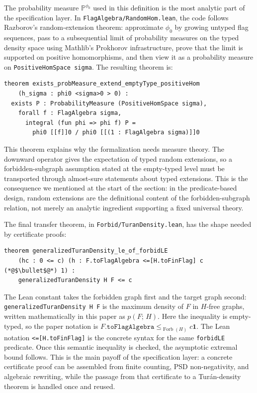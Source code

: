 \documentclass{article}
\newcommand{\tdensity}[2]{p(#1;\,#2)}
\newcommand{\forbLE}[1]{\leq_{\operatorname{Forb}(#1)}}
\newcommand{\lean}[1]{\texttt{#1}}
\begin{document}
The probability measure $\mathbb{P}^{\phi_0}$ used in this definition is
the most analytic part of the specification layer.  In
\lean{FlagAlgebra/RandomHom.lean}, the code follows Razborov's random-extension
theorem: approximate $\phi_0$ by growing untyped flag sequences, pass to a
subsequential limit of probability measures on the typed density space using
Mathlib's Prokhorov infrastructure, prove that the limit is supported on
positive homomorphisms, and then view it as a probability measure on
\lean{PositiveHomSpace sigma}.  The resulting theorem is:
\begin{lstlisting}
theorem exists_probMeasure_extend_emptyType_positiveHom
    (h_sigma : phi0 <sigma>0 > 0) :
  exists P : ProbabilityMeasure (PositiveHomSpace sigma),
    forall f : FlagAlgebra sigma,
      integral (fun phi => phi f) P =
        phi0 [[f]]0 / phi0 [[(1 : FlagAlgebra sigma)]]0
\end{lstlisting}
This theorem explains why the formalization needs measure theory.  The
downward operator gives the expectation of typed random extensions, so a
forbidden-subgraph assumption stated at the empty-typed level must be
transported through almost-sure statements about typed extensions.  This is
the consequence we mentioned at the start of the section: in the
predicate-based design, random extensions are the definitional content of the
forbidden-subgraph relation, not merely an analytic ingredient supporting a
fixed universal theory.

The final transfer theorem, in \lean{Forbid/TuranDensity.lean}, has the shape
needed by certificate proofs:
\begin{lstlisting}
theorem generalizedTuranDensity_le_of_forbidLE
    (hc : 0 <= c) (h : F.toFlagAlgebra <=[H.toFinFlag] c (*@$\bullet$@*) 1) :
    generalizedTuranDensity H F <= c
\end{lstlisting}
The Lean constant takes the forbidden graph first and the target graph
second: \lean{generalizedTuranDensity H F} is the maximum density of $F$ in
$H$-free graphs, written mathematically in this paper as $\tdensity{F}{H}$.
Here the inequality is empty-typed, so the paper notation is
$F.\lean{toFlagAlgebra} \forbLE{H} c\mathbf{1}$.
The Lean notation \lean{<=[H.toFinFlag]} is the concrete syntax for the same
\lean{forbidLE} predicate.  Once this semantic inequality is checked, the
asymptotic extremal bound follows.  This is the main payoff of the
specification layer: a concrete certificate proof can be assembled from finite
counting, PSD non-negativity, and algebraic rewriting, while the passage from
that certificate to a Tur\'an-density theorem is handled once and reused.
\end{document}
